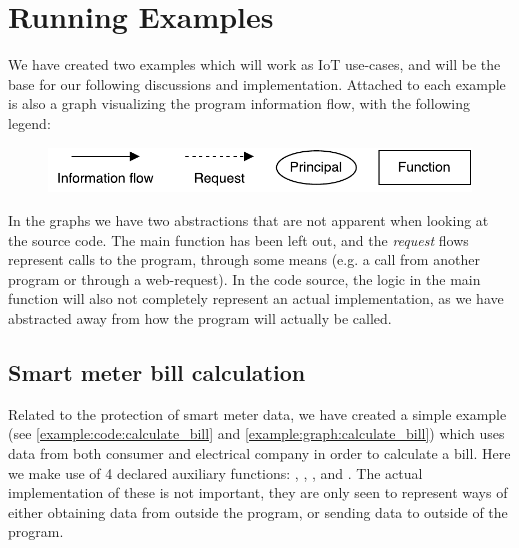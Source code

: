 
\section{Running Examples}\label{examples:sec}
We have created two examples which will work as IoT use-cases, and will be the base for our following discussions and implementation.
Attached to each example is also a graph visualizing the program information flow, with the following legend:
\begin{figure}[H]
  \centering
  \includegraphics[scale=0.8]{figures/dlm_legend}
\end{figure}
In the graphs we have two abstractions that are not apparent when looking at the source code.
The main function has been left out, and the \emph{request} flows represent calls to the program, through some means (e.g. a call from another program or through a web-request).
In the code source, the logic in the main function will also not completely represent an actual implementation, as we have abstracted away from how the program will actually be called.

\subsection{Smart meter bill calculation}
Related to the protection of smart meter data, we have created a simple example (see \cref{example:code:calculate_bill} and \cref{example:graph:calculate_bill}) which uses data from both consumer and electrical company in order to calculate a bill.
Here we make use of 4 declared auxiliary functions: , , , and .
The actual implementation of these is not important, they are only seen to represent ways of either obtaining data from outside the program, or sending data to outside of the program.

